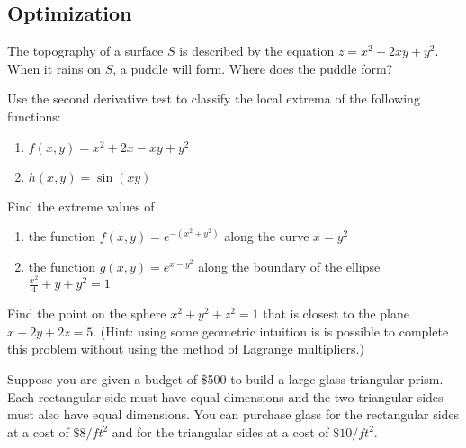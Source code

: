 
\newpage
\subsection{Optimization}

\BEN

\item %
The topography of a surface $S$ is described by the equation $z=x^2-2xy+y^2$. When it rains on $S$, a puddle will form. Where does the puddle form? 
\item

Use the second derivative test to classify the local extrema of the
following functions:
\begin{enumerate}
 \item $f(x,y) = x^2 + 2x - xy + y^2$
 \item $h(x,y) = \sin(xy)$
\end{enumerate}

\item

Find the extreme values of
\begin{enumerate}
 \item the function
  $f(x,y) = e^{-(x^2+y^2)}$
  along the curve $x = y^2$
 \item the function
  $g(x,y) = e^{x-y^2}$ along the boundary of the ellipse
  $\frac{x^2}{4}+y+y^2=1$
\end{enumerate}

\item

Find the point on the sphere $x^2 + y^2 + z^2 = 1$ that is closest
to the plane $x + 2y + 2z = 5$. (Hint: using some geometric intuition
is is possible to complete this problem without using the method of
Lagrange multipliers.)

\item
{}

Suppose you are given a budget of \$500 to build a large glass
triangular prism.  Each rectangular side must have equal dimensions
and the two triangular sides must also have equal dimensions.  You
can purchase glass for the rectangular sides at a cost of $\$8/ft^2$
and for the triangular sides at a cost of $\$10/ft^2$.

